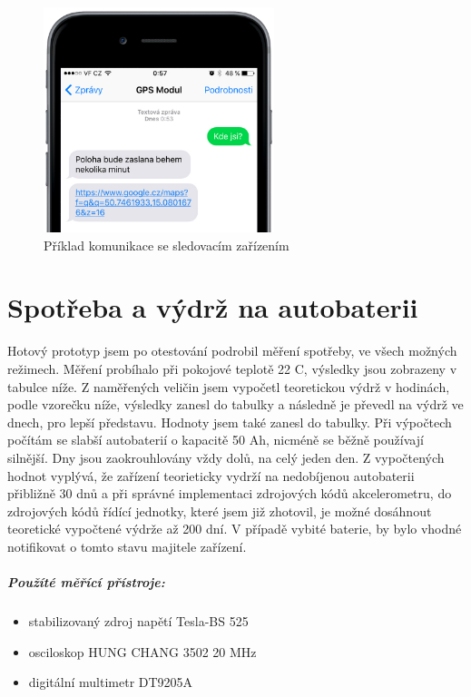 \documentclass[FM,BP]{tulthesis}  %
\begin{document}
\begin{figure}[H]
\begin{center}
\includegraphics[width=0.6\textwidth]{images/comm.png}
\caption{Příklad komunikace se sledovacím zařízením}
\label{image}
\end{center}
\end{figure}


\chapter{Spotřeba a výdrž na autobaterii}
Hotový prototyp jsem po otestování podrobil měření spotřeby, ve všech možných režimech. Měření probíhalo při pokojové teplotě 22 \degree C, výsledky jsou zobrazeny v tabulce níže. Z naměřených veličin jsem vypočetl teoretickou výdrž v hodinách, podle vzorečku níže, výsledky zanesl do tabulky a následně je převedl na výdrž ve dnech, pro lepší představu. Hodnoty jsem také zanesl do tabulky. Při výpočtech počítám se slabší autobaterií o kapacitě 50 Ah, nicméně se běžně používají silnější. Dny jsou zaokrouhlovány vždy dolů, na celý jeden den. Z vypočtených hodnot vyplývá, že zařízení teorieticky vydrží na nedobíjenou autobaterii přibližně 30 dnů a při správné implementaci zdrojových kódů akcelerometru, do zdrojových kódů řídící jednotky, které jsem již zhotovil, je možné dosáhnout teoretické vypočtené výdrže až 200 dní. V případě vybité baterie, by bylo vhodné notifikovat o tomto stavu majitele zařízení.

\paragraph{Použíté měřící přístroje:}
\begin{itemize}
\item stabilizovaný zdroj napětí Tesla-BS 525
\item osciloskop HUNG CHANG 3502 20 MHz
\item digitální multimetr DT9205A
\end{itemize}
\end{document}

